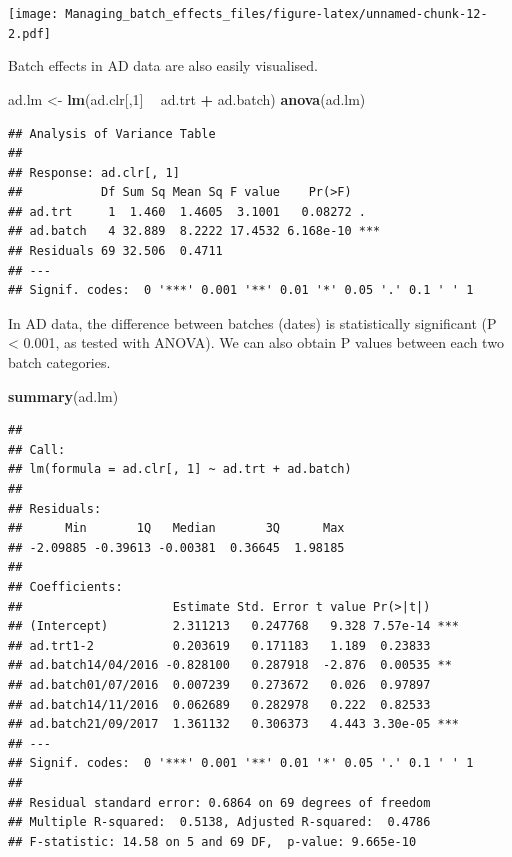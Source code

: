 \documentclass[]{book}
\newenvironment{Shaded}{\begin{snugshade}}{\end{snugshade}}
\newcommand{\KeywordTok}[1]{\textcolor[rgb]{0.13,0.29,0.53}{\textbf{#1}}}
\newcommand{\DecValTok}[1]{\textcolor[rgb]{0.00,0.00,0.81}{#1}}
\newcommand{\StringTok}[1]{\textcolor[rgb]{0.31,0.60,0.02}{#1}}
\newcommand{\OperatorTok}[1]{\textcolor[rgb]{0.81,0.36,0.00}{\textbf{#1}}}
\newcommand{\NormalTok}[1]{#1}
\begin{document}
\texttt{[image: Managing\_batch\_effects\_files/figure-latex/unnamed-chunk-12-2.pdf]}

Batch effects in AD data are also easily visualised.

\begin{Shaded}
\begin{Highlighting}[]
\NormalTok{ad.lm <-}\StringTok{ }\KeywordTok{lm}\NormalTok{(ad.clr[,}\DecValTok{1}\NormalTok{] }\OperatorTok{~}\StringTok{ }\NormalTok{ad.trt }\OperatorTok{+}\StringTok{ }\NormalTok{ad.batch)}
\KeywordTok{anova}\NormalTok{(ad.lm)}
\end{Highlighting}
\end{Shaded}

\begin{verbatim}
## Analysis of Variance Table
## 
## Response: ad.clr[, 1]
##           Df Sum Sq Mean Sq F value    Pr(>F)    
## ad.trt     1  1.460  1.4605  3.1001   0.08272 .  
## ad.batch   4 32.889  8.2222 17.4532 6.168e-10 ***
## Residuals 69 32.506  0.4711                      
## ---
## Signif. codes:  0 '***' 0.001 '**' 0.01 '*' 0.05 '.' 0.1 ' ' 1
\end{verbatim}

In AD data, the difference between batches (dates) is statistically
significant (P \textless{} 0.001, as tested with ANOVA). We can also
obtain P values between each two batch categories.

\begin{Shaded}
\begin{Highlighting}[]
\KeywordTok{summary}\NormalTok{(ad.lm)}
\end{Highlighting}
\end{Shaded}

\begin{verbatim}
## 
## Call:
## lm(formula = ad.clr[, 1] ~ ad.trt + ad.batch)
## 
## Residuals:
##      Min       1Q   Median       3Q      Max 
## -2.09885 -0.39613 -0.00381  0.36645  1.98185 
## 
## Coefficients:
##                     Estimate Std. Error t value Pr(>|t|)    
## (Intercept)         2.311213   0.247768   9.328 7.57e-14 ***
## ad.trt1-2           0.203619   0.171183   1.189  0.23833    
## ad.batch14/04/2016 -0.828100   0.287918  -2.876  0.00535 ** 
## ad.batch01/07/2016  0.007239   0.273672   0.026  0.97897    
## ad.batch14/11/2016  0.062689   0.282978   0.222  0.82533    
## ad.batch21/09/2017  1.361132   0.306373   4.443 3.30e-05 ***
## ---
## Signif. codes:  0 '***' 0.001 '**' 0.01 '*' 0.05 '.' 0.1 ' ' 1
## 
## Residual standard error: 0.6864 on 69 degrees of freedom
## Multiple R-squared:  0.5138, Adjusted R-squared:  0.4786 
## F-statistic: 14.58 on 5 and 69 DF,  p-value: 9.665e-10
\end{verbatim}
\end{document}
